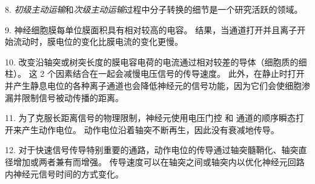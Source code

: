 8. \textit{初级主动运输}和\textit{次级主动运输}过程中分子转换的细节是一个研究活跃的领域。


9. 神经细胞膜每单位膜面积具有相对较高的电容。
结果，当通道打开并且离子开始流动时，膜电位的变化比膜电流的变化更慢。


10. 改变沿轴突或树突长度的膜电容电荷的电流通过相对较差的导体（细胞质的细柱）。
这 2 个因素结合在一起会减慢电压信号的传导速度。
此外，在静止时打开并产生静息电位的各种离子通道也会降低神经元的信号功能，因为它们会使细胞渗漏并限制信号被动传播的距离。 


11. 为了克服长距离信号的物理限制，神经元使用电压门控  和  通道的顺序瞬态打开来产生动作电位。
动作电位沿着轴突不断再生，因此没有衰减地传导。 


12. 对于快速信号传导特别重要的通路，动作电位的传导通过轴突髓鞘化、轴突直径增加或两者兼有而增强。
传导速度可以在轴突之间或轴突内以优化神经元回路内神经元信号时间的方式变化。









